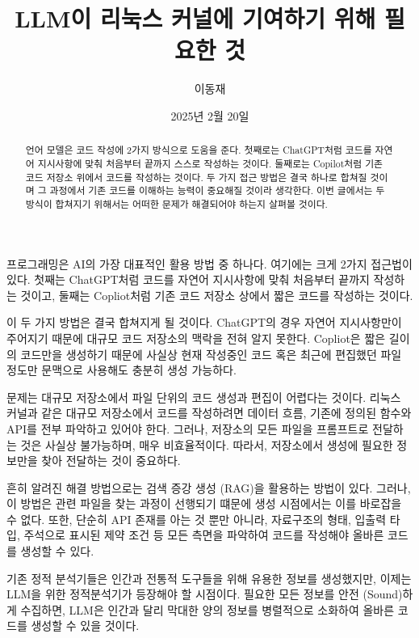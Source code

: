 \documentclass[11pt, oneside]{article}   	%
\title{LLM이 리눅스 커널에 기여하기 위해 필요한 것}
\author{이동재}
\date{2025년 2월 20일}
\begin{document}
\maketitle


\begin{abstract}
  언어 모델은 코드 작성에 2가지 방식으로 도움을 준다. 첫째로는 ChatGPT처럼 코드를 자연어 지시사항에 맞춰 처음부터 끝까지 스스로 작성하는 것이다.
  둘째로는 Copilot처럼 기존 코드 저장소 위에서 코드를 작성하는 것이다.
  두 가지 접근 방법은 결국 하나로 합쳐질 것이며 그 과정에서 기존 코드를 이해하는 능력이 중요해질 것이라 생각한다.
  이번 글에서는 두 방식이 합쳐지기 위해서는 어떠한 문제가 해결되어야 하는지 살펴볼 것이다.
\end{abstract}
  프로그래밍은 AI의 가장 대표적인 활용 방법 중 하나다. 여기에는 크게 2가지 접근법이 있다. 첫째는 ChatGPT처럼 코드를 자연어 지시사항에 맞춰 처음부터 끝까지 작성하는 것이고, 둘째는 Copliot처럼 기존 코드 저장소 상에서 짧은 코드를 작성하는 것이다.

  이 두 가지 방법은 결국 합쳐지게 될 것이다. ChatGPT의 경우 자연어 지시사항만이 주어지기 때문에 대규모 코드 저장소의 맥락을 전혀 알지 못한다. Copliot은 짧은 길이의 코드만을 생성하기 때문에 사실상 현재 작성중인 코드 혹은 최근에 편집했던 파일 정도만 문맥으로 사용해도 충분히 생성 가능하다.

  문제는 대규모 저장소에서 파일 단위의 코드 생성과 편집이 어렵다는 것이다. 리눅스 커널과 같은 대규모 저장소에서 코드를 작성하려면 데이터 흐름, 기존에 정의된 함수와 API를 전부 파악하고 있어야 한다.
  그러나, 저장소의 모든 파일을 프롬프트로 전달하는 것은 사실상 불가능하며, 매우 비효율적이다. 따라서, 저장소에서 생성에 필요한 정보만을 찾아 전달하는 것이 중요하다.

  흔히 알려진 해결 방법으로는 검색 증강 생성 (RAG)을 활용하는 방법이 있다. 그러나, 이 방법은 관련 파일을 찾는 과정이 선행되기 떄문에 생성 시점에서는 이를 바로잡을 수 없다.
  또한, 단순히 API 존재를 아는 것 뿐만 아니라, 자료구조의 형태, 입출력 타입, 주석으로 표시된 제약 조건 등 모든 측면을 파악하여 코드를 작성해야 올바른 코드를 생성할 수 있다.

  기존 정적 분석기들은 인간과 전통적 도구들을 위해 유용한 정보를 생성했지만, 이제는 LLM을 위한 정적분석기가 등장해야 할 시점이다. 필요한 모든 정보를 안전 (Sound)하게 수집하면, LLM은 인간과 달리 막대한 양의 정보를 병렬적으로 소화하여 올바른 코드를 생성할 수 있을 것이다.
\end{document}
